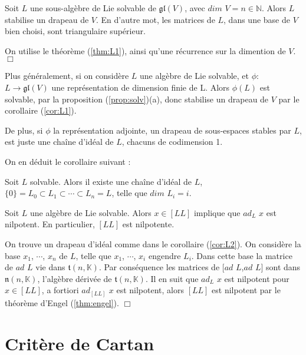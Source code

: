 \documentclass[a4paper,openany,12pt]{report}
\newcommand{\KK}{\mathbb{K}}
\newcommand{\NN}{\mathbb{N}}
\newcommand{\gl}{\mathfrak{gl}}
\newcommand{\ttt}{\mathfrak{t}}
\newcommand{\nn}{\mathfrak{n}}
\theoremstyle{break}
{\theorembodyfont{\upshape}
\newtheorem*{rmq}{Remarque :}
\newtheorem*{prv}{Preuve :}
\newtheorem*{ex}{Exemples :}
\newtheorem{exe}{Exemple : }
\newtheorem*{nota}{Notation :}}
\begin{document}
\begin{cor}\label{cor:L1}
\quad Soit $L$ une sous-algèbre de Lie solvable de $\gl(V)$, avec $dim$ $V = n \in \NN$. Alors $L$ stabilise un drapeau de $V$.
En d'autre mot, les matrices de $L$, dans une base de $V$ bien choisi, sont triangulaire supérieur.
\end{cor}

\begin{prv}
\quad On utilise le théorème (\ref{thm:L1}), ainsi qu'une récurrence sur la dimention de $V$. $\Box$
\end{prv}

\quad Plus généralement, si on considère $L$ une algèbre de Lie solvable, et $\phi$: $L \to \gl(V)$ une représentation de dimension finie de L. Alors $\phi(L)$ est solvable, par la proposition (\ref{prop:solv})(a), donc stabilise un drapeau de $V$ par le corollaire (\ref{cor:L1}).

\quad De plus, si $\phi$ la représentation adjointe, un drapeau de sous-espaces stables par $L$, est juste une chaîne d'idéal de $L$, chacuns de codimension 1.

On en déduit le corollaire suivant :

\begin{cor}\label{cor:L2}
\quad Soit $L$ solvable. 
Alors il existe une chaîne d'idéal de $L$, $\{0\}=L_{0} \subset L_{1} \subset \cdots \subset L_{n} = L$, telle que $dim$ $L_{i}=i$.
\end{cor}

\begin{cor}\label{cor:L3}
\quad Soit $L$ une algèbre de Lie solvable. Alors $x \in [LL]$ implique que $ad_{L}$ $x$ est nilpotent.
En particulier, $[LL]$ est nilpotente.
\end{cor}

\begin{prv}
\quad On trouve un drapeau d'idéal comme dans le corollaire (\ref{cor:L2}). On considère la base $x_{1}$, $\cdots$, $x_{n}$ de $L$, telle que $x_{1}$, $\cdots$, $x_{i}$ engendre $L_{i}$. Dans cette base la matrice de $ad$ $L$ vie dans $\ttt(n,\KK)$. Par conséquence les matrices de $[ad$ $L$,$ad$ $L]$ sont dans $\nn(n,\KK)$, l'algèbre dérivée de $\ttt(n,\KK)$. Il en suit que $ad_{L}$ $x$ est nilpotent pour $x \in [LL]$, a fortiori $ad_{[LL]}$ $x$ est nilpotent, alors $[LL]$ est nilpotent par le théorème d'Engel (\ref{thm:engel}). $\Box$
\end{prv}

\chapter{Critère de Cartan}
\end{document}
